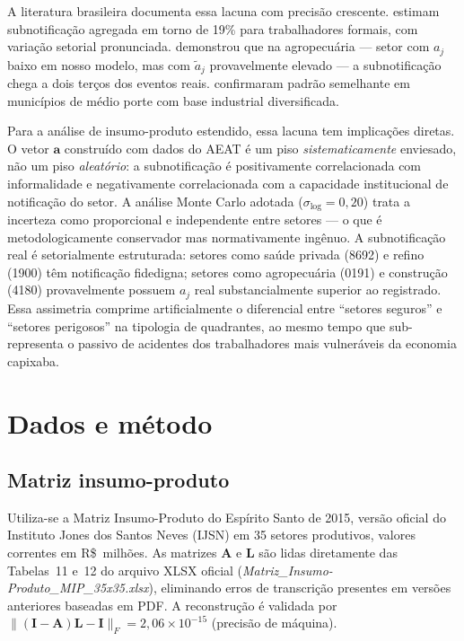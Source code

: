 \documentclass[12pt, a4paper]{article}
\begin{document}
A literatura brasileira documenta essa lacuna com precisão crescente.
\citet{chagas2011saude} estimam subnotificação agregada em torno de
19\% para trabalhadores formais, com variação setorial pronunciada.
\citet{wunsch2004perfil} demonstrou que na agropecuária --- setor com
$a_j$ baixo em nosso modelo, mas com $\tilde{a}_j$ provavelmente
elevado --- a subnotificação chega a dois terços dos eventos reais.
\citet{cordeiro2005underreporting} confirmaram padrão semelhante em
municípios de médio porte com base industrial diversificada.

Para a análise de insumo-produto estendido, essa lacuna tem implicações
diretas. O vetor $\mathbf{a}$ construído com dados do AEAT é um piso
\textit{sistematicamente} enviesado, não um piso \textit{aleatório}:
a subnotificação é positivamente correlacionada com informalidade e
negativamente correlacionada com a capacidade institucional de
notificação do setor. A análise Monte Carlo adotada
($\sigma_{\log} = 0{,}20$) trata a incerteza como proporcional e
independente entre setores --- o que é metodologicamente conservador
mas normativamente ingênuo. A subnotificação real é setorialmente
estruturada: setores como saúde privada (8692) e refino (1900) têm
notificação fidedigna; setores como agropecuária (0191) e construção
(4180) provavelmente possuem $a_j$ real substancialmente superior ao
registrado. Essa assimetria comprime artificialmente o diferencial entre
``setores seguros'' e ``setores perigosos'' na tipologia de quadrantes,
ao mesmo tempo que sub-representa o passivo de acidentes dos
trabalhadores mais vulneráveis da economia capixaba.

\section{Dados e método}
\label{sec:dados}

\subsection{Matriz insumo-produto}

Utiliza-se a Matriz Insumo-Produto do Espírito Santo de 2015, versão
oficial do Instituto Jones dos Santos Neves (IJSN) em 35 setores
produtivos, valores correntes em R\$~milhões. As matrizes $\mathbf{A}$
e $\mathbf{L}$ são lidas diretamente das Tabelas~11 e~12 do arquivo XLSX
oficial (\textit{Matriz\_Insumo-Produto\_MIP\_35x35.xlsx}), eliminando
erros de transcrição presentes em versões anteriores baseadas em PDF.
A reconstrução é validada por
$\|(\mathbf{I}-\mathbf{A})\mathbf{L} - \mathbf{I}\|_F = 2{,}06 \times 10^{-15}$
(precisão de máquina).
\end{document}
